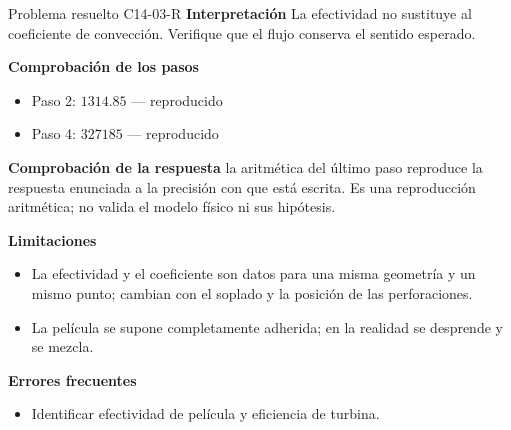\documentclass[10pt,openany]{book}
\begin{document}
\begin{studiumworked}{Problema resuelto C14-03-R}
\noindent\textbf{Interpretación}
La efectividad no sustituye al coeficiente de convección. Verifique que el flujo conserva el sentido esperado.

\noindent\textbf{Comprobación de los pasos}
\begin{itemize}
\item Paso 2: $1314.85$ — reproducido
\item Paso 4: $327185$ — reproducido
\end{itemize}

\noindent\textbf{Comprobación de la respuesta} la aritmética del último paso reproduce la respuesta enunciada a la precisión con que está escrita. Es una reproducción aritmética; no valida el modelo físico ni sus hipótesis.

\noindent\textbf{Limitaciones}
\begin{itemize}
\item La efectividad y el coeficiente son datos para una misma geometría y un mismo punto; cambian con el soplado y la posición de las perforaciones.
\item La película se supone completamente adherida; en la realidad se desprende y se mezcla.
\end{itemize}

\noindent\textbf{Errores frecuentes}
\begin{itemize}
\item Identificar efectividad de película y eficiencia de turbina.
\end{itemize}
\end{studiumworked}
\end{document}
